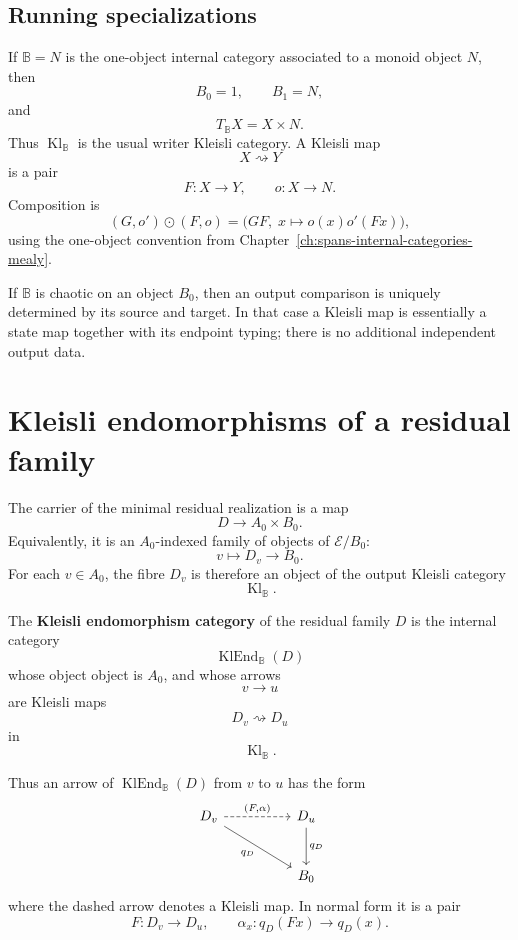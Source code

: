 \subsection{Running specializations}
\label{subsec:syn-to-output-kleisli-running-specializations}

If \(\mathbb B=N\) is the one-object internal category associated to a monoid
object \(N\), then
\[
    B_0=1,
    \qquad
    B_1=N,
\]
and
\[
    T_{\mathbb B}X=X\times N.
\]
Thus \(\operatorname{Kl}_{\mathbb B}\) is the usual writer Kleisli category.
A Kleisli map
\[
    X\rightsquigarrow Y
\]
is a pair
\[
    F:X\to Y,
    \qquad
    o:X\to N.
\]
Composition is
\[
    (G,o')\odot(F,o)
    =
    \bigl(GF,\;x\mapsto o(x)o'(Fx)\bigr),
\]
using the one-object convention from Chapter~\ref{ch:spans-internal-categories-mealy}.

If \(\mathbb B\) is chaotic on an object \(B_0\), then an output comparison is
uniquely determined by its source and target. In that case a Kleisli map is
essentially a state map together with its endpoint typing; there is no
additional independent output data.

\section{Kleisli endomorphisms of a residual family}
\label{sec:syn-to-kleisli-endomorphisms-residual-family}

The carrier of the minimal residual realization is a map
\[
    D\to A_0\times B_0.
\]
Equivalently, it is an \(A_0\)-indexed family of objects of
\(\mathcal E/B_0\):
\[
    v\longmapsto D_v\to B_0.
\]
For each \(v\in A_0\), the fibre \(D_v\) is therefore an object of the output
Kleisli category
\[
    \operatorname{Kl}_{\mathbb B}.
\]

\begin{definition}
\label{def:syn-to-kleisli-endomorphism-category}
    The \textbf{Kleisli endomorphism category} of the residual family \(D\) is
    the internal category
    \[
        \operatorname{KlEnd}_{\mathbb B}(D)
    \]
    whose object object is \(A_0\), and whose arrows
    \[
        v\to u
    \]
    are Kleisli maps
    \[
        D_v\rightsquigarrow D_u
    \]
    in
    \[
        \operatorname{Kl}_{\mathbb B}.
    \]
\end{definition}

Thus an arrow of \(\operatorname{KlEnd}_{\mathbb B}(D)\) from \(v\) to \(u\)
has the form
\[
\begin{tikzcd}[column sep=huge, row sep=large]
    D_v
        \arrow[r, dashed, "{(F,\alpha)}"]
        \arrow[dr, "q_D"']
    &
    D_u
        \arrow[d, "q_D"]
    \\
    &
    B_0
\end{tikzcd}
\]
where the dashed arrow denotes a Kleisli map. In normal form it is a pair
\[
    F:D_v\to D_u,
    \qquad
    \alpha_x:q_D(Fx)\to q_D(x).
\]

